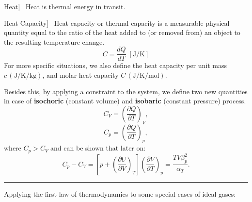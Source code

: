 \documentclass[UTF8]{book}
\newenvironment{theorem}[2][Theorem]{\begin{trivlist}
\item[\hskip \labelsep {\bfseries #1}\hskip \labelsep {\bfseries }]}{\end{trivlist}}
\begin{document}
\begin{theorem}
[Heat]~  {Heat is thermal energy in transit.}
\end{theorem}
\begin{theorem}
[Heat Capacity]~  {Heat capacity or thermal capacity is a measurable physical quantity equal to the ratio of the heat added to (or removed from) an object to the resulting temperature change.}
\[\boxed{C=\frac{dQ}{dT} \; [\si{\joule\per\kelvin}]}\]
 {For more specific situations, we also define the heat capacity per unit mass $c\,(\si{\joule\per\kelvin\per\kilo\gram})$, and molar heat capacity $C\,(\si{\joule\per\kelvin\per\mole})$}.

{Besides this, by applying a constraint to the system, we define two new quantities in case of \textbf{isochoric} (constant volume) and \textbf{isobaric} (constant pressure) process.}
$$C_V=\left(\dfrac{\partial Q}{\partial T}\right)_V,$$
$$C_p=\left(\dfrac{\partial Q}{\partial T}\right)_p,$$
{where }$C_p > C_V$ { and can be shown that later on:}
\begin{equation}\label{heat capacity}
C_p-C_V=\left[p+\left(\dfrac{\partial U}{\partial V}\right)_T\right]\left(\dfrac{\partial V}{\partial T}\right)_p=\dfrac{TV\beta _p^2}{\alpha _T }.
\end{equation}
\end{theorem}
\rule{\textwidth}{1pt}
{Applying the first law of thermodynamics to some special cases of ideal gases:}
\end{document}
